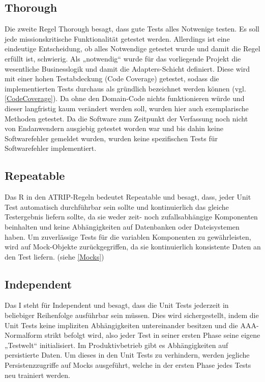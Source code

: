 \subsection{Thorough}
Die zweite Regel Thorough besagt, dass gute Tests alles Notwenige testen. Es soll jede missionskritische Funktionalität getestet werden. Allerdings ist eine eindeutige Entscheidung, ob alles Notwendige getestet wurde und damit die Regel erfüllt ist, schwierig. Als „notwendig“ wurde für das vorliegende Projekt die wesentliche Businesslogik und damit die Adapters-Schicht definiert. Diese wird mit einer hohen Testabdeckung (Code Coverage) getestet, sodass die implementierten Tests durchaus als gründlich bezeichnet werden können (vgl. \autoref{CodeCoverage}). Da ohne den Domain-Code nichts funktionieren würde und dieser langfristig kaum verändert werden soll, wurden hier auch exemplarische Methoden getestet. Da die Software zum Zeitpunkt der Verfassung noch nicht von Endanwendern ausgiebig getestet worden war und bis dahin keine Softwarefehler gemeldet wurden, wurden keine spezifischen Tests für Softwarefehler implementiert.

\subsection{Repeatable}
Das R in den ATRIP-Regeln bedeutet Repeatable und besagt, dass, jeder Unit Test automatisch durchführbar sein sollte und kontinuierlich das gleiche Testergebnis liefern sollte, da sie weder zeit- noch zufallsabhängige Komponenten beinhalten und keine Abhängigkeiten auf Datenbanken oder Dateisystemen haben. Um zuverlässige Tests für die variablen Komponenten zu gewährleisten, wird auf Mock-Objekte zurückgegriffen, da sie kontinuierlich konsistente Daten an den Test liefern. (siehe \autoref{Mocks})


\subsection{Independent}
Das I steht für Independent und besagt, dass die Unit Tests jederzeit in beliebiger Reihenfolge ausführbar sein müssen. Dies wird sichergestellt, indem die Unit Tests keine impliziten Abhängigkeiten untereinander besitzen und die AAA-Normalform strikt befolgt wird, also jeder Test in seiner ersten Phase seine eigene „Testwelt“ initialisiert. Im Produktivbetrieb gibt es Abhängigkeiten auf persistierte Daten. Um dieses in den Unit Tests zu verhindern, werden jegliche Persistenzzugriffe auf Mocks ausgeführt, welche in der ersten Phase jedes Tests neu trainiert werden.

